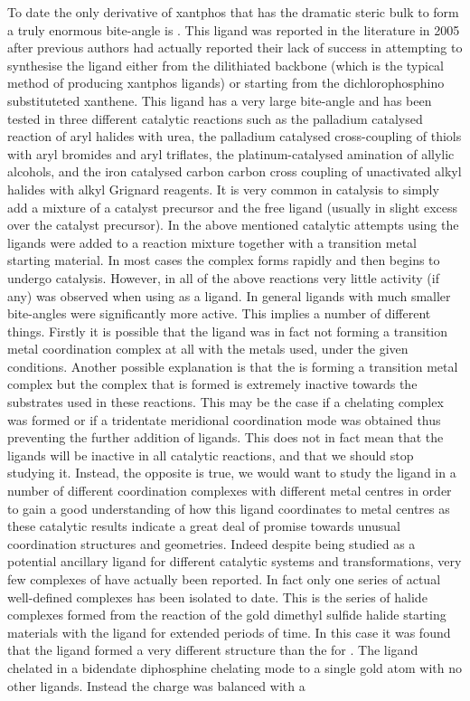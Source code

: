 To date the only derivative of xantphos that has the dramatic steric bulk to form a truly enormous bite-angle is \tBuxantphos.  This ligand was reported in the literature in 2005  after previous authors had actually reported their lack of success in attempting to synthesise the \tBuxantphos{} ligand either from the dilithiated backbone (which is the typical method of producing xantphos ligands) or starting from the dichlorophosphino substituteted xanthene.  This ligand has a very large bite-angle and has been tested in three different catalytic reactions such as the palladium catalysed reaction of aryl halides with urea, the palladium catalysed cross-coupling of thiols with aryl bromides and aryl triflates, the platinum-catalysed amination of allylic alcohols, and the iron catalysed carbon carbon cross coupling of unactivated alkyl halides with alkyl Grignard reagents.  It is very common in catalysis to simply add a mixture of a catalyst precursor and the free ligand (usually in slight excess over the catalyst precursor).  In the above mentioned catalytic attempts using \tBuxantphos{} the ligands were added to a reaction mixture together with a transition metal starting material.  In most cases the complex forms rapidly and then begins to undergo catalysis.  However, in all of the above reactions very little activity (if any) was observed when using \tBuxantphos{} as a ligand.  In general ligands with much smaller bite-angles were significantly more active.  This implies a number of different things.  Firstly it is possible that the \tBuxantphos{} ligand was in fact not forming a transition metal coordination complex at all with the metals used, under the given conditions.  Another possible explanation is that the \tBuxantphos{} is forming a transition metal complex but the complex that is formed is extremely inactive towards the substrates used in these reactions.  This may be the case if a \trans{} chelating complex was formed or if a tridentate meridional coordination mode was obtained thus preventing the further addition of ligands.  This does not in fact mean that the \tBuxantphos{} ligands will be inactive in all catalytic reactions, and that we should stop studying it.  Instead, the opposite is true, we would want to study the \tBuxantphos{} ligand in a number of different coordination complexes with different metal centres in order to gain a good understanding of how this ligand coordinates to metal centres as these catalytic results indicate a great deal of promise towards unusual coordination structures and geometries.  Indeed despite being studied as a potential ancillary ligand for  different catalytic systems and transformations, very few complexes of \tBuxantphos{} have actually been reported.  In fact only one series of actual well-defined complexes has been isolated to date.  This is the series of halide complexes formed from the reaction of the gold dimethyl sulfide halide starting materials with the \tBuxantphos ligand for extended periods of time.  In this case it was found that the \tBuxantphos{} ligand formed a very different structure than the for \Phxantphos{}.  The \tBuxantphos{} ligand chelated in a bidendate diphosphine chelating mode to a single gold atom with no other ligands.  Instead the charge was balanced with a 